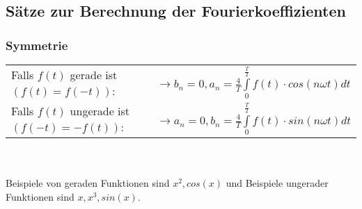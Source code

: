 \subsection{Sätze zur Berechnung der Fourierkoeffizienten}
\subsubsection{Symmetrie}
\begin{tabular}{ll}
  Falls $f(t)$ gerade ist $(f(t) = f(-t))$: &\ $\rightarrow b_{n} = 0, a_{n} = \frac{4}{T}\int\limits_{0}^{\frac{T}{2}} f(t) \cdot cos(n \omega t)dt$\\
  Falls $f(t)$ ungerade ist $(f(-t) = -f(t))$: &\ $\rightarrow a_{n} = 0, b_{n} = \frac{4}{T}\int\limits_{0}^{\frac{T}{2}} f(t) \cdot sin(n \omega t)dt$\\
\end{tabular}\\\\
Beispiele von geraden Funktionen sind $x^2, cos(x)$ und Beispiele ungerader Funktionen sind $x, x^3, sin(x)$.
